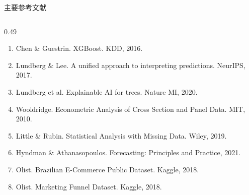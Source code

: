 \documentclass[aspectratio=169]{beamer}
\begin{document}
\begin{frame}[shrink=22]{主要参考文献}
\begin{columns}[T]
\begin{column}{0.49\textwidth}
\begin{enumerate}
        \item Chen \& Guestrin. XGBoost. KDD, 2016.
        \item Lundberg \& Lee. A unified approach to interpreting predictions. NeurIPS, 2017.
        \item Lundberg et al. Explainable AI for trees. Nature MI, 2020.
        \item Wooldridge. Econometric Analysis of Cross Section and Panel Data. MIT, 2010.
        \item Little \& Rubin. Statistical Analysis with Missing Data. Wiley, 2019.
        \item Hyndman \& Athanasopoulos. Forecasting: Principles and Practice, 2021.
        \item Olist. Brazilian E-Commerce Public Dataset. Kaggle, 2018.
        \item Olist. Marketing Funnel Dataset. Kaggle, 2018.
      \end{enumerate}
    \end{column}
  \end{columns}
\end{frame}
\end{document}
